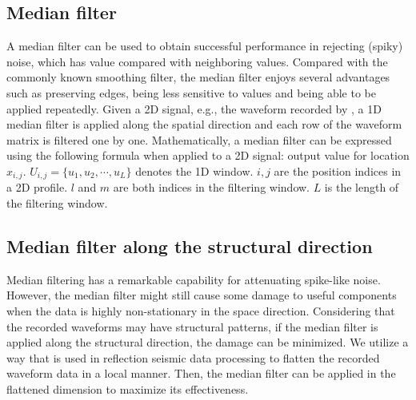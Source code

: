 \subsection{Median filter}
A median filter can be used to obtain successful performance in rejecting  (spiky) noise, which has  value compared with neighboring values. Compared with the commonly known smoothing filter, the median filter enjoys several advantages such as preserving edges, being less sensitive to  values and being able to be applied repeatedly. Given a 2D signal, e.g., the waveform recorded by , a 1D median filter is applied along the spatial direction and each row of the waveform matrix is filtered one by one. Mathematically, a median filter can be expressed using the following formula \cite[]{yangkang2015svmf} when applied to a 2D signal: 
 output value for location $x_{i,j}$. $U_{i,j}=\{u_1,u_2,\cdots,u_L\}$ denotes the 1D  window. $i,j$ are the position indices in a 2D profile. $l$ and $m$ are both indices in the filtering window.  $L$ is the length of the filtering window. 

\subsection{Median filter along the structural direction}
Median filtering has a remarkable capability for attenuating spike-like noise. However, the median filter might still cause some damage to useful components when the data is highly non-stationary in the space direction. Considering that the recorded waveforms may have structural patterns, if the median filter is applied along the structural direction, the damage can be minimized. We utilize a way that is used in reflection seismic data processing to flatten the recorded waveform data in a local manner.  Then, the median filter can be applied in the flattened dimension to maximize its effectiveness. 

